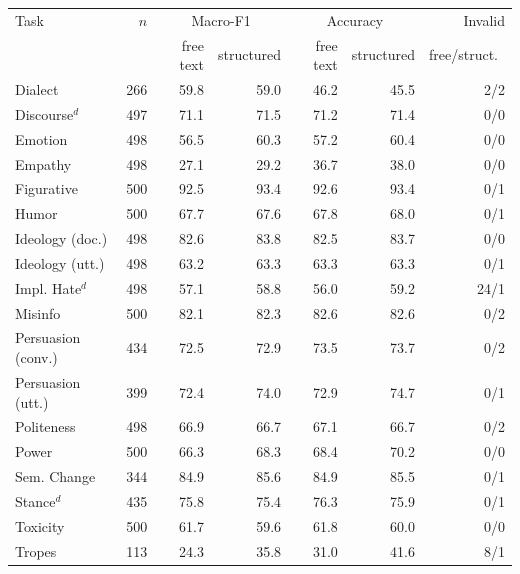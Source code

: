 \begin{tabular}{lrrrrrr}
\toprule
Task & $n$ & \multicolumn{2}{c}{Macro-F1} & \multicolumn{2}{c}{Accuracy} & Invalid \\
 & & free text & structured & free text & structured & free/struct.\ \\
\midrule
Dialect & 266 & 59.8 & 59.0 & 46.2 & 45.5 & 2/2 \\
Discourse$^{d}$ & 497 & 71.1 & 71.5 & 71.2 & 71.4 & 0/0 \\
Emotion & 498 & 56.5 & 60.3 & 57.2 & 60.4 & 0/0 \\
Empathy & 498 & 27.1 & 29.2 & 36.7 & 38.0 & 0/0 \\
Figurative & 500 & 92.5 & 93.4 & 92.6 & 93.4 & 0/1 \\
Humor & 500 & 67.7 & 67.6 & 67.8 & 68.0 & 0/1 \\
Ideology (doc.) & 498 & 82.6 & 83.8 & 82.5 & 83.7 & 0/0 \\
Ideology (utt.) & 498 & 63.2 & 63.3 & 63.3 & 63.3 & 0/1 \\
Impl. Hate$^{d}$ & 498 & 57.1 & 58.8 & 56.0 & 59.2 & 24/1 \\
Misinfo & 500 & 82.1 & 82.3 & 82.6 & 82.6 & 0/2 \\
Persuasion (conv.) & 434 & 72.5 & 72.9 & 73.5 & 73.7 & 0/2 \\
Persuasion (utt.) & 399 & 72.4 & 74.0 & 72.9 & 74.7 & 0/1 \\
Politeness & 498 & 66.9 & 66.7 & 67.1 & 66.7 & 0/2 \\
Power & 500 & 66.3 & 68.3 & 68.4 & 70.2 & 0/0 \\
Sem. Change & 344 & 84.9 & 85.6 & 84.9 & 85.5 & 0/1 \\
Stance$^{d}$ & 435 & 75.8 & 75.4 & 76.3 & 75.9 & 0/1 \\
Toxicity & 500 & 61.7 & 59.6 & 61.8 & 60.0 & 0/0 \\
Tropes & 113 & 24.3 & 35.8 & 31.0 & 41.6 & 8/1 \\
\bottomrule
\end{tabular}
